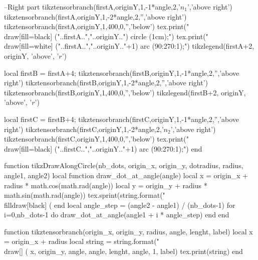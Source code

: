 \begin{luacode*}
          --Right part
          tikztensorbranch(firstA,originY,1,-1*angle,2,'$n_{1}$','above right')
          tikztensorbranch(firstA,originY,1,-2*angle,2,'','above right')
          tikztensorbranch(firstA,originY,1,400,0,'','below')
          tex.print("\\draw[fill=black] ("..firstA..","..originY..") circle (1cm);")
          tex.print("\\draw[fill=white] ("..firstA..","..originY.."+1) arc (90:270:1);")
          tikzlegend(firstA+2, originY, 'above', '$r$')

          local firstB = firstA+4;
          tikztensorbranch(firstB,originY,1,-1*angle,2,'','above right')
          tikztensorbranch(firstB,originY,1,-2*angle,2,'','above right')
          tikztensorbranch(firstB,originY,1,400,0,'','below')
          tikzlegend(firstB+2, originY, 'above', '$r$')

          local firstC = firstB+4;
          tikztensorbranch(firstC,originY,1,-1*angle,2,'','above right')
          tikztensorbranch(firstC,originY,1,-2*angle,2,'$n_{2}$','above right')
          tikztensorbranch(firstC,originY,1,400,0,'','below')
          tex.print("\\draw[fill=black] ("..firstC..","..originY.."+1) arc (90:270:1);")
    end

function tikzDrawAlongCircle(nb_dots, origin_x, origin_y, dotradius, radius, angle1, angle2)
    local function draw_dot_at_angle(angle)
      local x = origin_x + radius * math.cos(math.rad(angle))
      local y = origin_y + radius * math.sin(math.rad(angle))
      tex.sprint(string.format("\\filldraw[black] (%
    end
    local angle_step = (angle2 - angle1) / (nb_dots-1)
    for i=0,nb_dots-1 do
      draw_dot_at_angle(angle1 + i * angle_step)
    end
  end
  
    function tikztensorbranch(origin_x, origin_y, radius, angle, lenght, label)
      local x = origin_x + radius
      local string = string.format("\\draw[] (%
      x, origin_y, angle, angle, lenght, angle, 1, label)
      tex.print(string)
    end
  

\end{luacode*}
